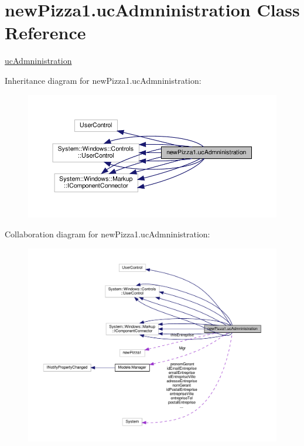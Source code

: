 \hypertarget{classnewPizza1_1_1ucAdmninistration}{}\section{new\+Pizza1.\+uc\+Admninistration Class Reference}
\label{classnewPizza1_1_1ucAdmninistration}


\hyperlink{classnewPizza1_1_1ucAdmninistration}{uc\+Admninistration}  




Inheritance diagram for new\+Pizza1.\+uc\+Admninistration\+:
\nopagebreak
\begin{figure}[H]
\begin{center}
\leavevmode
\includegraphics[width=350pt]{classnewPizza1_1_1ucAdmninistration__inherit__graph}
\end{center}
\end{figure}


Collaboration diagram for new\+Pizza1.\+uc\+Admninistration\+:
\nopagebreak
\begin{figure}[H]
\begin{center}
\leavevmode
\includegraphics[width=350pt]{classnewPizza1_1_1ucAdmninistration__coll__graph}
\end{center}
\end{figure}
